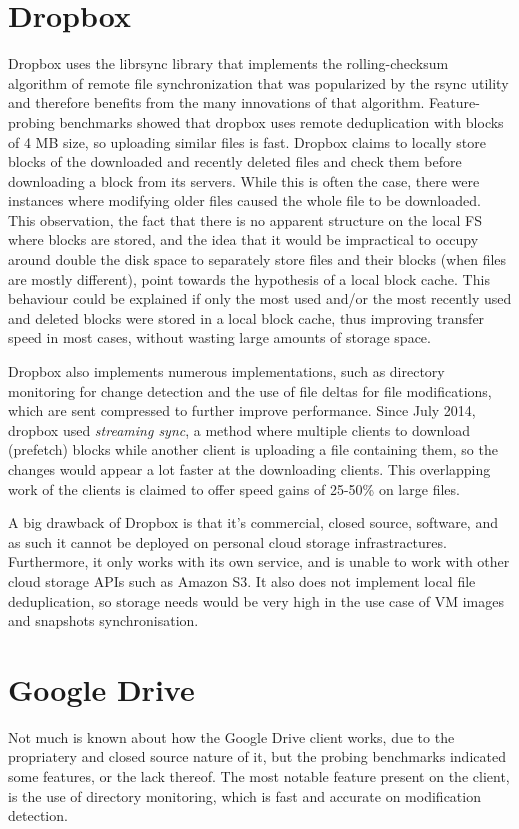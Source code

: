 \section{Dropbox}
  Dropbox uses the librsync library that implements the rolling-checksum algorithm of remote file synchronization that was popularized by the rsync utility and therefore benefits from the many innovations of that algorithm. Feature-probing benchmarks showed that dropbox uses remote deduplication with blocks of 4 MB size, so uploading similar files is fast. Dropbox claims to locally store blocks of the downloaded and recently deleted files and check them before downloading a block from its servers. While this is often the case, there were instances where modifying older files caused the whole file to be downloaded. This observation, the fact that there is no apparent structure on the local FS where blocks are stored, and the idea that it would be impractical to occupy around double the disk space to separately store files and their blocks (when files are mostly different), point towards the hypothesis of a local block cache. This behaviour could be explained if only the most used and/or the most recently used and deleted blocks were stored in a local block cache, thus improving transfer speed in most cases, without wasting large amounts of storage space.

  Dropbox also implements numerous implementations, such as directory monitoring for change detection and the use of file deltas for file modifications, which are sent compressed to further improve performance. Since July 2014, dropbox used \emph{streaming sync}\cite{dropbox-stream-sync}, a method where multiple clients to download (prefetch) blocks while another client is uploading a file containing them, so the changes would appear a lot faster at the downloading clients. This overlapping work of the clients is claimed to offer speed gains of 25-50\% on large files.

  A big drawback of Dropbox is that it's commercial, closed source, software, and as such it cannot be deployed on personal cloud storage infrastractures. Furthermore, it only works with its own service, and is unable to work with other cloud storage APIs such as Amazon S3. It also does not implement local file deduplication, so storage needs would be very high in the use case of VM images and snapshots synchronisation.

\section{Google Drive}
  Not much is known about how the Google Drive client works, due to the propriatery and closed source nature of it, but the probing benchmarks indicated some features, or the lack thereof. The most notable feature present on the client, is the use of directory monitoring, which is fast and accurate on modification detection.

